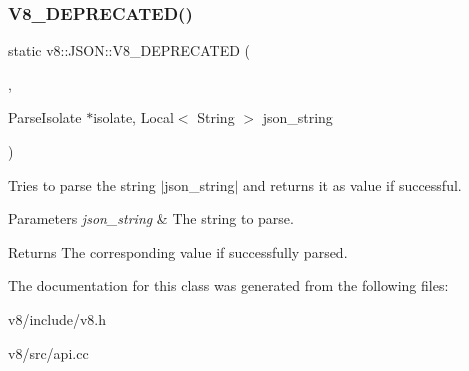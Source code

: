 \subsubsection{\texorpdfstring{V8\+\_\+\+D\+E\+P\+R\+E\+C\+A\+T\+E\+D()}{V8\_DEPRECATED()}}
{\footnotesize\ttfamily static v8\+::\+J\+S\+O\+N\+::\+V8\+\_\+\+D\+E\+P\+R\+E\+C\+A\+T\+ED (\begin{DoxyParamCaption}\item[{\char`\"{}Use the maybe version taking context\char`\"{}}]{,  }\item[{\mbox{\hyperlink{classv8_1_1MaybeLocal}{Maybe\+Local}}$<$ \mbox{\hyperlink{classv8_1_1Value}{Value}} $>$ }]{ParseIsolate $\ast$isolate, Local$<$ String $>$ json\+\_\+string }\end{DoxyParamCaption})\hspace{0.3cm}{\ttfamily [static]}}

Tries to parse the string $\vert$json\+\_\+string$\vert$ and returns it as value if successful.


\begin{DoxyParams}{Parameters}
{\em json\+\_\+string} & The string to parse. \\
\hline
\end{DoxyParams}
\begin{DoxyReturn}{Returns}
The corresponding value if successfully parsed. 
\end{DoxyReturn}


The documentation for this class was generated from the following files\+:\begin{DoxyCompactItemize}
\item 
v8/include/v8.\+h\item 
v8/src/api.\+cc\end{DoxyCompactItemize}
